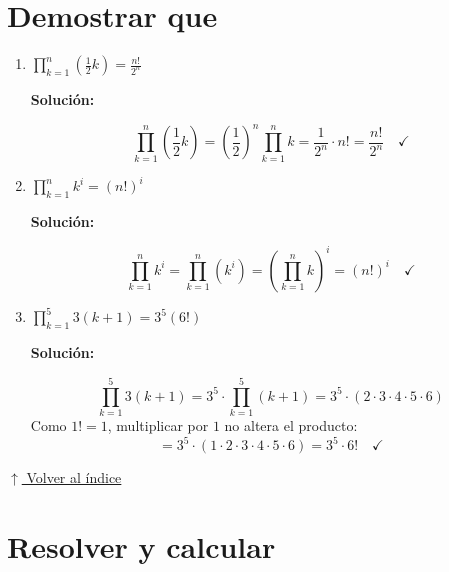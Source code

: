 \documentclass[12pt]{article}
\newcommand{\solucion}{%
    \vspace{0.8em}%
    \textbf{Solución:}%
}
\newcommand{\volverindice}{%
    \vspace{1em}%
    \begin{flushright}%
        \hyperlink{indice}{\small $\uparrow$ Volver al índice}%
    \end{flushright}%
}
\begin{document}
\section{Demostrar que}

\begin{enumerate}[label=\alph*.-]
    \item $\displaystyle\prod_{k=1}^{n}\left(\frac{1}{2}k\right) = \frac{n!}{2^n}$

    \solucion
    \[
    \prod_{k=1}^{n}\left(\frac{1}{2}k\right)
    = \left(\frac{1}{2}\right)^n \prod_{k=1}^{n}k
    = \frac{1}{2^n}\cdot n!
    = \frac{n!}{2^n} \quad\checkmark
    \]

    \item $\displaystyle\prod_{k=1}^{n} k^i = (n!)^i$

    \solucion
    \[
    \prod_{k=1}^{n} k^i
    = \prod_{k=1}^{n}(k^i)
    = \left(\prod_{k=1}^{n}k\right)^i
    = (n!)^i \quad\checkmark
    \]

    \item $\displaystyle\prod_{k=1}^{5} 3(k+1) = 3^5(6!)$

    \solucion
    \[
    \prod_{k=1}^{5} 3(k+1)
    = 3^5 \cdot \prod_{k=1}^{5}(k+1)
    = 3^5\cdot(2\cdot3\cdot4\cdot5\cdot6)
    \]
    Como $1! = 1$, multiplicar por $1$ no altera el producto:
    \[
    = 3^5\cdot(1\cdot2\cdot3\cdot4\cdot5\cdot6)
    = 3^5\cdot 6! \quad\checkmark
    \]

\end{enumerate}

\volverindice
\newpage

\section{Resolver y calcular}
\end{document}
